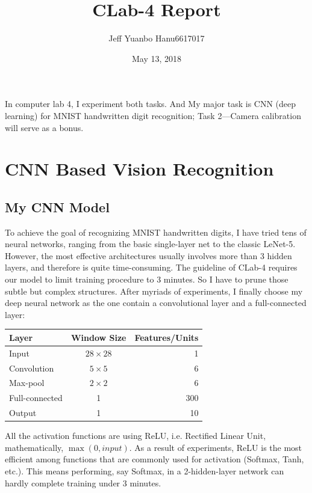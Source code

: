 \documentclass{article}
\title{CLab-4 Report}
\author{Jeff Yuanbo Han\quad u6617017}
\date{May 13, 2018}
\begin{document}
\maketitle

In computer lab 4, I experiment both tasks. And My major task is CNN (deep learning) for MNIST handwritten digit recognition; Task 2---Camera calibration will serve as a bonus.

\tableofcontents


\section{CNN Based Vision Recognition}
\subsection{My CNN Model}
To achieve the goal of recognizing MNIST handwritten digits, I have tried tens of neural networks, ranging from the basic single-layer net to the classic LeNet-5. However, the most effective architectures usually involves more than 3 hidden layers, and therefore is quite time-consuming. The guideline of CLab-4 requires our model to limit training procedure to 3 minutes. So I have to prune those subtle but complex structures. After myriads of experiments, I finally choose my deep neural network as the one contain a convolutional layer and a full-connected layer:

\begin{center}
	\begin{tabular}{lcr}
		\toprule
		Layer & Window Size & Features/Units \\
		\midrule
		Input & $28\times28$ & 1 \\
		Convolution & $5\times5$ & 6 \\
		Max-pool & $2\times2$ & 6 \\
		Full-connected & 1 & 300 \\
		Output & 1 & 10 \\
		\bottomrule
	\end{tabular}
\end{center}

All the activation functions are using ReLU, i.e. Rectified Linear Unit, mathematically, $\max(0, input)$. As a result of experiments, ReLU is the most efficient among functions that are commonly used for activation (Softmax, Tanh, etc.). This means performing, say Softmax, in a 2-hidden-layer network can hardly complete training under 3 minutes.
\end{document}
